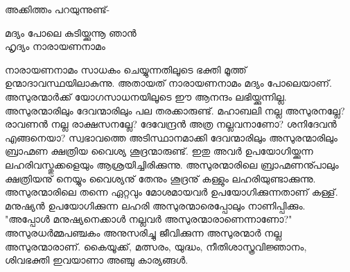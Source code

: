 അക്കിത്തം പറയുന്നുണ്ട്-
\begin{center}
\hspace{2em}മദ്യം പോലെ കുടിയ്ക്കുന്നൂ ഞാൻ\\
\hspace{2em}ഹൃദ്യം നാരായണനാമം\\
\end{center}
നാരായണനാമം സാധകം ചെയ്യുന്നതിലൂടെ ഭക്തി മൂത്ത് ഉന്മാദാവസ്ഥയിലാകുന്നു. അതായത് നാരായണനാമം മദ്യം പോലെയാണ്‌. അസുരന്മാർക്ക് യോഗസാധനയിലൂടെ ഈ ആനന്ദം ലഭിയ്ക്കുന്നില്ല. അസുരന്മാരിലും ദേവന്മാരിലും പല തരക്കാരുണ്ട്. മഹാബലി നല്ല അസുരനല്ലേ? രാവണൻ നല്ല രാക്ഷസനല്ലേ? ദേവേന്ദ്രൻ അത്ര നല്ലവനാണോ? ശനിദേവൻ എങ്ങനെയാ? സ്വഭാവത്തെ അടിസ്ഥാനമാക്കി ദേവന്മാരിലും അസുരന്മാരിലും ബ്രാഹ്മണ ക്ഷത്രിയ വൈശ്യ ശൂദ്രന്മാരുണ്ട്. ഇതു അവർ ഉപയോഗിയ്ക്കുന്ന ലഹരിവസ്തുക്കളെയും ആശ്രയിച്ചിരിക്കുന്നു. അസുരന്മാരിലെ ബ്രാഹ്മണനു്പാലും ക്ഷത്രിയനു് നെയ്യും വൈശ്യനു് തേനും ശൂദ്രനു് കള്ളും ലഹരിയുണ്ടാക്കുന്നു. അസുരന്മാരിലെ തന്നെ ഏറ്റവും മോശമായവർ ഉപയോഗിക്കുന്നതാണ്‌ കള്ള്. മനുഷ്യൻ ഉപയോഗിക്കുന്ന ലഹരി അസുരന്മാരെപ്പോലും നാണിപ്പിക്കും.\\
"അപ്പോൾ മനുഷ്യനെക്കാൾ നല്ലവർ അസുരന്മാരാണെന്നാണോ?"\\
അസുരധർമ്മപഞ്ചകം അനുസരിച്ചു ജീവിക്കുന്ന അസുരന്മാർ നല്ല അസുരന്മാരാണ്‌. കൈയൂക്ക്, മത്സരം, യുദ്ധം, നീതിശാസ്ത്രവിജ്ഞാനം, ശിവഭക്തി ഇവയാണാ അഞ്ചു കാര്യങ്ങൾ.
